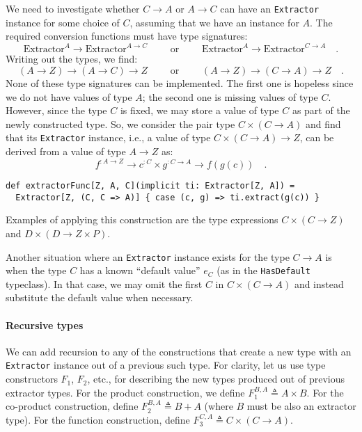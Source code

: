 We need to investigate whether $C\rightarrow A$ or $A\rightarrow C$
can have an \lstinline!Extractor! instance for some choice of $C$,
assuming that we have an instance for $A$. The required conversion
functions must have type signatures:
\[
\text{Extractor}^{A}\rightarrow\text{Extractor}^{A\rightarrow C}\quad\quad\text{ or }\quad\quad\text{Extractor}^{A}\rightarrow\text{Extractor}^{C\rightarrow A}\quad.
\]
Writing out the types, we find:
\[
\left(A\rightarrow Z\right)\rightarrow\left(A\rightarrow C\right)\rightarrow Z\quad\quad\text{ or }\quad\quad\left(A\rightarrow Z\right)\rightarrow\left(C\rightarrow A\right)\rightarrow Z\quad.
\]
None of these type signatures can be implemented. The first one is
hopeless since we do not have values of type $A$; the second one
is missing values of type $C$. However, since the type $C$ is fixed,
we may store a value of type $C$ as part of the newly constructed
type. So, we consider the pair type $C\times\left(C\rightarrow A\right)$
and find that its \lstinline!Extractor! instance, i.e., a value of
type $C\times\left(C\rightarrow A\right)\rightarrow Z$, can be derived
from a value of type $A\rightarrow Z$ as:
\[
f^{:A\rightarrow Z}\rightarrow c^{:C}\times g^{:C\rightarrow A}\rightarrow f(g(c))\quad.
\]
\begin{lstlisting}
def extractorFunc[Z, A, C](implicit ti: Extractor[Z, A]) =
  Extractor[Z, (C, C => A)] { case (c, g) => ti.extract(g(c)) }
\end{lstlisting}
Examples of applying this construction are the type expressions $C\times\left(C\rightarrow Z\right)$
and $D\times\left(D\rightarrow Z\times P\right)$.

Another situation where an \lstinline!Extractor! instance exists
for the type $C\rightarrow A$ is when the type $C$ has a known \textsf{``}default
value\textsf{''} $e_{C}$ (as in the \lstinline!HasDefault! typeclass). In
that case, we may omit the first $C$ in $C\times(C\rightarrow A)$
and instead substitute the default value when necessary.

\paragraph{Recursive types}

We can add recursion to any of the constructions that create a new
type with an \lstinline!Extractor! instance out of a previous such
type. For clarity, let us use type constructors $F_{1}$, $F_{2}$,
etc., for describing the new types produced out of previous extractor
types. For the product construction, we define $F_{1}^{B,A}\triangleq A\times B$.
For the co-product construction, define $F_{2}^{B,A}\triangleq B+A$
(where $B$ must be also an extractor type). For the function construction,
define $F_{3}^{C,A}\triangleq C\times\left(C\rightarrow A\right)$.

